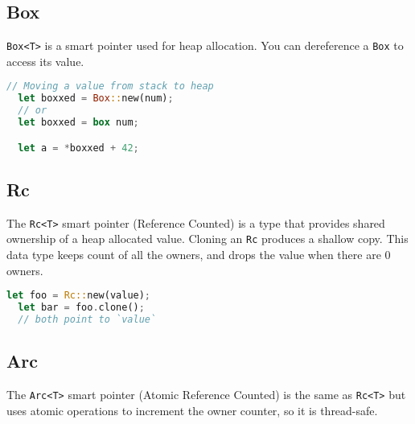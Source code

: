 \documentclass{article}
\begin{document}
\subsection{Box}

\texttt{Box<T>} is a smart pointer used for heap allocation.
You can dereference a \texttt{Box} to access its value.

\begin{lstlisting}[language=Rust, style=boxed, numbers=none]
  // Moving a value from stack to heap
  let boxxed = Box::new(num);
  // or
  let boxxed = box num;

  let a = *boxxed + 42;
\end{lstlisting}

\subsection{Rc}

The \texttt{Rc<T>} smart pointer (Reference Counted) is a type that provides
shared ownership of a heap allocated value. Cloning an \texttt{Rc} produces a shallow copy.
This data type keeps count of all the owners, and drops the value when there are 0 owners.

\begin{lstlisting}[language=Rust, style=boxed, numbers=none]
  let foo = Rc::new(value);
  let bar = foo.clone();
  // both point to `value`
\end{lstlisting}

\subsection{Arc}

The \texttt{Arc<T>} smart pointer (Atomic Reference Counted) is the same as \texttt{Rc<T>}
but uses atomic operations to increment the owner counter, so it is thread-safe.
\end{document}
